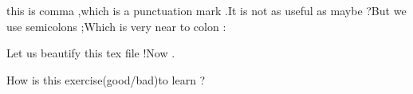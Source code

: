 \documentclass{article}
\begin{document}
this is comma    ,which is a punctuation mark .It is not as useful as maybe   ?But we use semicolons ;Which is very near to colon :

Let us beautify this tex file !Now .

How is this exercise(good/bad)to learn ?
\end{document}

